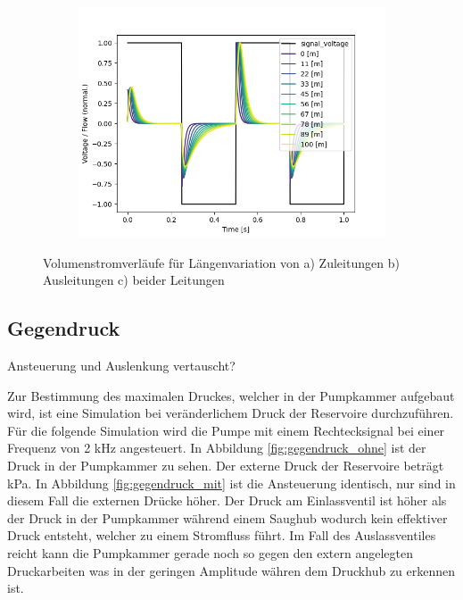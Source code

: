 \documentclass[fontsize=12pt, a4paper]{scrartcl}
\begin{document}
\begin{figure}[H]
\begin{subfigure}[H]{0.48\textwidth}
		\includegraphics[width=\textwidth, valign=t]{bilder/tubelength/tl_both_branch_multisweep_flow.png}
	\end{subfigure}
    \caption{Volumenstromverläufe für Längenvariation von a) Zuleitungen b) Ausleitungen c) beider Leitungen}
    \label{fig:sweepströme}
\end{figure}

\subsection{Gegendruck}

Ansteuerung und Auslenkung vertauscht?

Zur Bestimmung des maximalen Druckes, welcher in der Pumpkammer aufgebaut wird, ist eine Simulation bei veränderlichem Druck der Reservoire durchzuführen. Für die folgende Simulation wird die Pumpe mit einem Rechtecksignal bei einer Frequenz von 2 kHz angesteuert. In Abbildung \ref{fig:gegendruck_ohne} ist der Druck in der Pumpkammer zu sehen. Der externe Druck der Reservoire beträgt kPa. In Abbildung \ref{fig:gegendruck_mit} ist die Ansteuerung identisch, nur sind in diesem Fall die externen Drücke höher. Der Druck am Einlassventil ist höher als der Druck in der Pumpkammer während einem Saughub wodurch kein effektiver Druck entsteht, welcher zu einem Stromfluss führt. Im Fall des Auslassventiles reicht kann die Pumpkammer gerade noch so gegen den extern angelegten Druckarbeiten was in der geringen Amplitude währen dem Druckhub zu erkennen ist.
\end{document}
